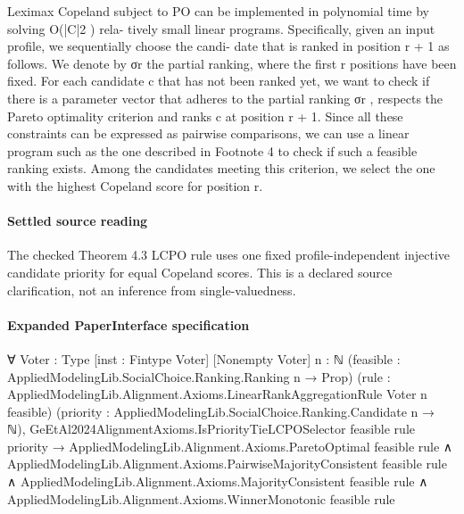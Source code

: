 \documentclass[10pt]{article}
\begin{document}
\begin{ReviewVerbatim}
Leximax Copeland subject to PO can be implemented in polynomial time by solving O(|C|2 ) rela-
tively small linear programs. Specifically, given an input profile, we sequentially choose the candi-
date that is ranked in position r + 1 as follows. We denote by σr the partial ranking, where the first
r positions have been fixed. For each candidate c that has not been ranked yet, we want to check
if there is a parameter vector that adheres to the partial ranking σr , respects the Pareto optimality
criterion and ranks c at position r + 1. Since all these constraints can be expressed as pairwise
comparisons, we can use a linear program such as the one described in Footnote 4 to check if such
a feasible ranking exists. Among the candidates meeting this criterion, we select the one with the
highest Copeland score for position r.
\end{ReviewVerbatim}

\paragraph{Settled source reading}
\begin{sloppypar}
The checked Theorem 4.\allowbreak{}3 LCPO rule uses one fixed profile-\allowbreak{}independent injective candidate priority for equal Copeland scores.\allowbreak{} This is a declared source clarification, not an inference from single-\allowbreak{}valuedness.\allowbreak{}
\end{sloppypar}

\paragraph{Expanded PaperInterface specification}
\begin{ReviewVerbatim}
∀ {Voter : Type} [inst : Fintype Voter] [Nonempty Voter] {n : ℕ}
  (feasible : AppliedModelingLib.SocialChoice.Ranking.Ranking n → Prop)
  (rule : AppliedModelingLib.Alignment.Axioms.LinearRankAggregationRule Voter n feasible)
  (priority : AppliedModelingLib.SocialChoice.Ranking.Candidate n → ℕ),
  GeEtAl2024AlignmentAxioms.IsPriorityTieLCPOSelector feasible rule priority →
    AppliedModelingLib.Alignment.Axioms.ParetoOptimal feasible rule ∧
      AppliedModelingLib.Alignment.Axioms.PairwiseMajorityConsistent feasible rule ∧
        AppliedModelingLib.Alignment.Axioms.MajorityConsistent feasible rule ∧
          AppliedModelingLib.Alignment.Axioms.WinnerMonotonic feasible rule
\end{ReviewVerbatim}
\end{document}
